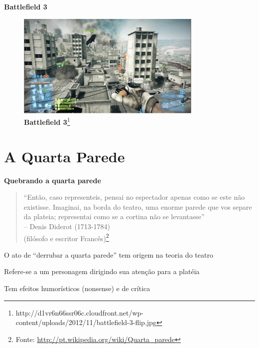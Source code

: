 \expandafter\documentclass\expandafter[table, usenames, svgnames, dvipsnames, \classopts]{beamer}
\begin{document}
\begin{frame}{\textbf{Battlefield 3}}
    \centering
    \begin{figure}
        \includegraphics[draft,height=5cm]{tank}
        \caption{\scriptsize\textbf{Battlefield 3}\footnote{http://d1vr6n66ssr06c.cloudfront.net/wp-content/uploads/2012/11/battlefield-3-flip.jpg}}
    \end{figure}
\end{frame}

\section{A Quarta Parede}

\begin{frame}{\textbf{Quebrando a quarta parede}}

	\begin{quotation}
		\noindent
		``Então, caso representeis, pensai no espectador apenas como se este não existisse. Imaginai, na borda do teatro, uma enorme parede que vos separe da plateia; representai como se a cortina não se levantasse''\\
		\hfill -- Denis Diderot (1713-1784)\\
		\hfill (filósofo e escritor Francês)\footnote{Fonte: \url{http://pt.wikipedia.org/wiki/Quarta_parede}}
	\end{quotation}
	
	\vspace{1em}

	\begin{outline}
		\1 O ato de ``derrubar a quarta parede'' tem origem na teoria do teatro
		
		\1 Refere-se a um personagem dirigindo sua atenção para a platéia
			
		\1 Tem efeitos humorísticos (nonsense) e de crítica
	\end{outline}

\end{frame}
\end{document}
